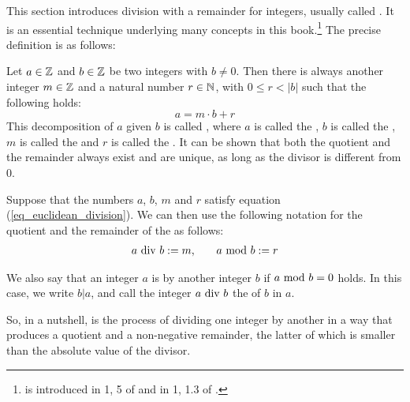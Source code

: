 This section introduces division with a remainder for integers, usually called . It is an essential technique underlying many concepts in this book.\footnote{ is introduced in \chaptname{} 1, \secname{} 5 of \cite{mignotte-1992} and in \chaptname{} 1, \secname{} 1.3 of \cite{cohen-2010}.} The precise definition is as follows:

Let $ a \in \mathbb{Z} $ and $ b \in \mathbb{Z} $ be two integers with $b\neq 0$. Then there is always another integer $ m \in \mathbb{Z} $ and a natural number $ r \in \mathbb{N} $, with $ 0 \leq r <|b| $ such that the following holds:
\begin{equation}
\label{eq_euclidean_division}
a = m \cdot b + r
\end{equation}
This decomposition of $a$ given $b$ is called , where $ a $ is called the , $ b $ is called the , $m$ is called the  and $r$ is called the . It can be shown that both the quotient and the remainder always exist and are unique, as long as the divisor is different from $0$.
\begin{notation}
\label{eq_euclidean_division_notation}
Suppose that the numbers $a$, $b$, $m$ and $r$ satisfy equation (\ref{eq_euclidean_division}). We can then use the following notation for the quotient and the remainder of the  as follows:
\begin{equation}
\label{def_integer_division_and_modulus}
\begin{array}{lcr}
a \text{ div } b: = m, & & a \text{ mod } b: = r
\end{array}
\end{equation}

We also say that an integer $ a $ is  by another integer $ b $ if $ a \text{ mod } b = 0 $ holds. In this case, we write $ b | a $, and call the integer $a \text{ div } b$ the \label{def:cofactor} of $b$ in $a$.
\end{notation}
So, in a nutshell,  is the process of dividing one integer by another in a way that produces a quotient and a non-negative remainder, the latter of which is smaller than the absolute value of the divisor.

